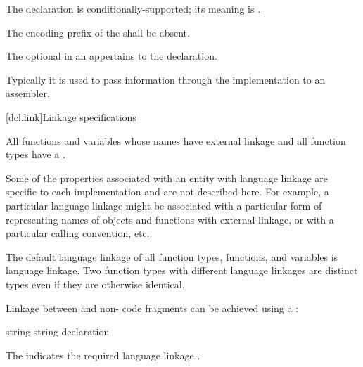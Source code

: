 \documentclass{wg21}
\begin{document}
The  declaration is conditionally-supported; its meaning is
.
\begin{addedblock}
The encoding prefix of the  shall be absent.
\end{addedblock}
The optional  in
an  appertains to the  declaration.
\begin{note}
    Typically it is used to pass information through the implementation to
    an assembler.
\end{note}

[dcl.link]{Linkage specifications}%

\pnum
All functions and variables whose names have external linkage
and all function types
have a .
\begin{note}
    Some of the properties associated with an entity with language linkage
    are specific to each implementation and are not described here. For
    example, a particular language linkage might be associated with a
    particular form of representing names of objects and functions with
    external linkage, or with a particular calling convention, etc.
\end{note}
The default language linkage of all function types, functions, and
variables is \Cpp{} language linkage. Two function types with
different language linkages are distinct types even if they are
otherwise identical.

\pnum
Linkage between \Cpp{} and  non-\Cpp{} code fragments can
be achieved using a :

%
%
%
\begin{bnf}
    \br
     string \terminal{\{}  \terminal{\}}\br
     string declaration
\end{bnf}

The  indicates the required language linkage .
\end{document}
